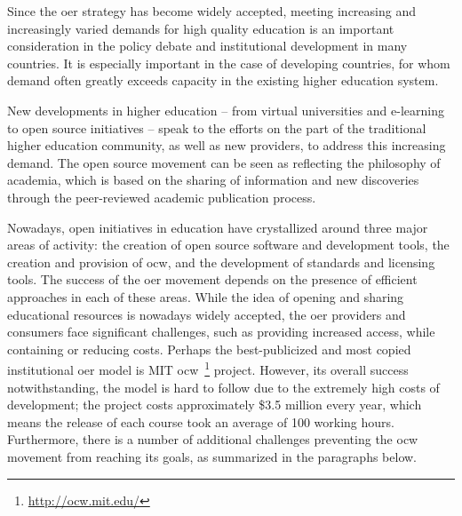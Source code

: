 \documentclass[PhD, Submit, ngerman,UKenglish,table]{scrbook}
\begin{document}
Since the \gls{oer} strategy has become widely accepted, meeting increasing and increasingly varied demands for high quality education is an important consideration in the policy debate and institutional development in many countries.
It is especially important in the case of developing countries, for whom demand often greatly exceeds capacity in the existing higher education system.

New developments in higher education – from virtual universities and e-learning to open source initiatives – speak to the efforts on the part of the traditional higher education community, as well as new providers, to address this increasing demand.
The open source movement can be seen as reflecting the philosophy of academia, which is based on the sharing of information and new discoveries through the peer-reviewed academic publication process.

Nowadays, open initiatives in education have crystallized around three major areas of activity: the creation of open source software and development tools, the creation and provision of \gls{ocw}, and the development of standards and licensing tools.
The success of the \gls{oer} movement depends on the presence of efficient approaches in each of these areas.
While the idea of opening and sharing educational resources is nowadays widely accepted, the \gls{oer} providers and consumers face significant challenges, such as providing increased access, while containing or reducing costs.
Perhaps the best-publicized and most copied institutional \gls{oer} model is MIT \gls{ocw}~\footnote{\url{http://ocw.mit.edu/}} project.
However, its overall success notwithstanding, the model is hard to follow due to the extremely high costs of development; the project costs approximately \$3.5 million every year, which means the release of each course took an average of 100 working hours.
Furthermore, there is a number of additional challenges preventing the \gls{ocw} movement from reaching its goals, as summarized in the paragraphs below.
\end{document}
